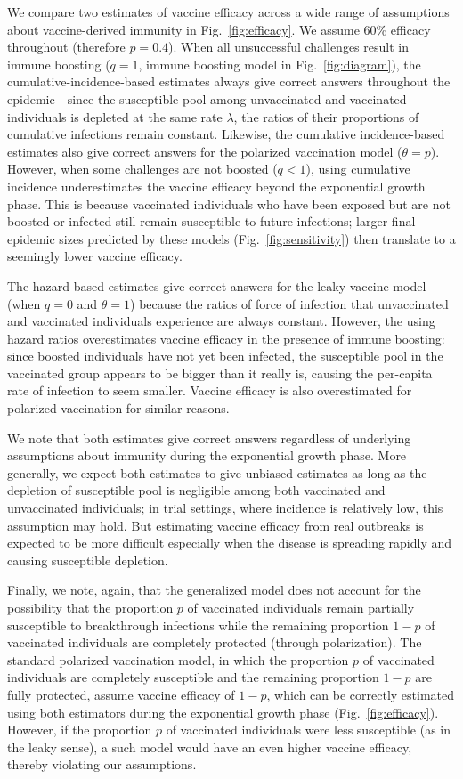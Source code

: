 \documentclass[12pt]{article}
\newcommand{\fref}[1]{Fig.~\ref{fig:#1}}
\begin{document}
We compare two estimates of vaccine efficacy across a wide range of assumptions about vaccine-derived immunity in \fref{efficacy}.
We assume 60\% efficacy throughout (therefore $p = 0.4$).
When all unsuccessful challenges result in immune boosting ($q=1$, immune boosting model in \fref{diagram}), the cumulative-incidence-based estimates always give correct answers throughout the epidemic---since the susceptible pool among unvaccinated and vaccinated individuals is depleted at the same rate $\lambda$, the ratios of their proportions of cumulative infections remain constant.
Likewise, the cumulative incidence-based estimates also give correct answers for the polarized vaccination model ($\theta = p$).
However, when some challenges are not boosted ($q < 1$), using cumulative incidence underestimates the vaccine efficacy beyond the exponential growth phase.
This is because vaccinated individuals who have been exposed but are not boosted or infected still remain susceptible to future infections; 
larger final epidemic sizes predicted by these models (\fref{sensitivity}) then translate to a seemingly lower vaccine efficacy.

The hazard-based estimates give correct answers for the leaky vaccine model (when $q=0$ and $\theta=1$) because the ratios of force of infection that unvaccinated and vaccinated individuals experience are always constant.
However, the using hazard ratios overestimates vaccine efficacy in the presence of immune boosting: since boosted individuals have not yet been infected, the susceptible pool in the vaccinated group appears to be bigger than it really is, causing the per-capita rate of infection to seem smaller.
Vaccine efficacy is also overestimated for polarized vaccination for similar reasons.

We note that both estimates give correct answers regardless of underlying assumptions about immunity during the exponential growth phase.
More generally, we expect both estimates to give unbiased estimates as long as the depletion of susceptible pool is negligible among both vaccinated and unvaccinated individuals;
in trial settings, where incidence is relatively low, this assumption may hold.
But estimating vaccine efficacy from real outbreaks is expected to be more difficult especially when the disease is spreading rapidly and causing susceptible depletion.

Finally, we note, again, that the generalized model does not account for the possibility that the proportion $p$ of vaccinated individuals remain partially susceptible to breakthrough infections while the remaining proportion $1-p$ of vaccinated individuals are completely protected (through polarization).
The standard polarized vaccination model, in which the proportion $p$ of vaccinated individuals are completely susceptible and the remaining proportion $1-p$ are fully protected, assume vaccine efficacy of $1-p$, which can be correctly estimated using both estimators during the exponential growth phase (\fref{efficacy}).
However, if the proportion $p$ of vaccinated individuals were less susceptible (as in the leaky sense), a such model would have an even higher vaccine efficacy, thereby violating our assumptions.
\end{document}

